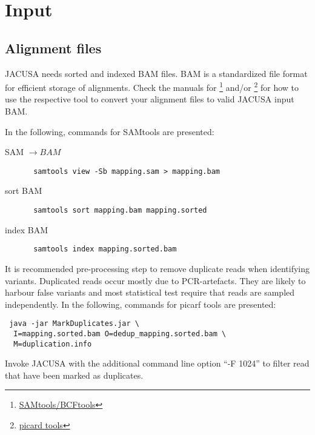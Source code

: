 \documentclass[10pt, a4paper]{article}
\begin{document}
\section{Input}
\subsection{Alignment files}
JACUSA needs sorted and indexed BAM files. BAM is a standardized file format for
efficient storage of alignments. Check the manuals for
\footnote{\href{http://samtools.sourceforge.net/}{SAMtools/BCFtools}} and/or
\footnote{\href{http://broadinstitute.github.io/picard/}{picard tools}} for how to use the
respective tool to convert your alignment files to valid JACUSA input BAM.

In the following, commands for SAMtools are presented:
\begin{description}
\item[SAM $\rightarrow BAM$] \begin{verbatim} samtools view -Sb mapping.sam > mapping.bam \end{verbatim}
\item[sort BAM] \begin{verbatim} samtools sort mapping.bam mapping.sorted \end{verbatim} 
\item[index BAM] \begin{verbatim} samtools index mapping.sorted.bam \end{verbatim}
\end{description}

It is recommended pre-processing step to remove duplicate reads when identifying variants.
Duplicated reads occur mostly due to PCR-artefacts. 
They are likely to harbour false variants and most statistical test require that reads are sampled independently.  
In the following, commands for picarf tools are presented:
\begin{verbatim} java -jar MarkDuplicates.jar \ 
  I=mapping.sorted.bam O=dedup_mapping.sorted.bam \ 
  M=duplication.info
\end{verbatim}
Invoke JACUSA with the additional command line option ``-F 1024'' to filter read that have been marked as duplicates.
\end{document}
